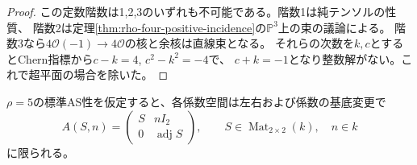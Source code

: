 \begin{proof}
この定数階数は1,2,3のいずれも不可能である。階数1は純テンソルの性質、
階数2は定理\ref{thm:rho-four-positive-incidence}の$\mathbb P^3$上の束の議論による。
階数3なら$4\mathcal O(-1)\to4\mathcal O$の核と余核は直線束となる。
それらの次数を$k,c$とするとChern指標から$c-k=4$, $c^2-k^2=-4$で、
$c+k=-1$となり整数解がない。これで超平面の場合を除いた。
\end{proof}

\begin{proposition}[係数の五次元空間の正規形]\label{prop:rho-five-spin-form}
$\rho=5$の標準AS性を仮定すると、各係数空間は左右および係数の基底変更で
\[
 A(S,n)=\begin{pmatrix}S&nI_2\\0&\operatorname{adj}S\end{pmatrix},
 \qquad S\in\operatorname{Mat}_{2\times2}(k),\quad n\in k
\]
に限られる。
\end{proposition}
